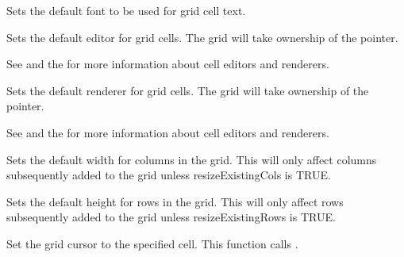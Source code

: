 {\label{wxgridsetdefaultcellfont}


Sets the default font to be used for grid cell text.

\label{wxgridsetdefaulteditor}


Sets the default editor for grid cells. The grid will take ownership of the pointer.

See  and
the  for more information about cell editors and renderers.

\label{wxgridsetdefaultrenderer}


Sets the default renderer for grid cells. The grid will take ownership of the pointer.

See  and
the  for more information about cell editors and renderers.

\label{wxgridsetdefaultcolsize}


Sets the default width for columns in the grid. This will only affect columns subsequently added to
the grid unless resizeExistingCols is TRUE. 

\label{wxgridsetdefaultrowsize}


Sets the default height for rows in the grid. This will only affect rows subsequently added
to the grid unless resizeExistingRows is TRUE.

\label{wxgridsetgridcursor}


Set the grid cursor to the specified cell. 
This function calls .

}
